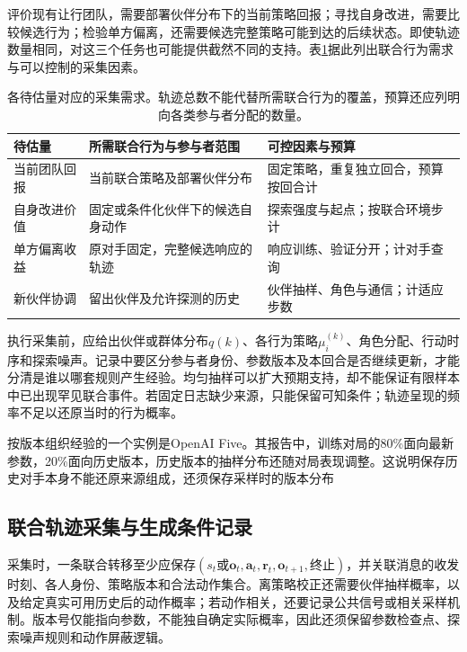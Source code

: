 评价现有让行团队，需要部署伙伴分布下的当前策略回报；寻找自身改进，需要比较候选行为；检验单方偏离，还需要候选完整策略可能到达的后续状态。即使轨迹数量相同，对这三个任务也可能提供截然不同的支持。表\ref{tab:rl-multi-agent-data-needs}据此列出联合行为需求与可以控制的采集因素。

\begin{table}[htbp]
 \centering
 \begin{tabularx}{\linewidth}{@{}l >{\raggedright\arraybackslash}X >{\raggedright\arraybackslash}X@{}}
 \toprule
 待估量 & 所需联合行为与参与者范围 & 可控因素与预算\\
 \midrule
 当前团队回报 & 当前联合策略及部署伙伴分布 & 固定策略，重复独立回合，预算按回合计\\
 自身改进价值 & 固定或条件化伙伴下的候选自身动作 & 探索强度与起点；按联合环境步计\\
 单方偏离收益 & 原对手固定，完整候选响应的轨迹 & 响应训练、验证分开；计对手查询\\
 新伙伴协调 & 留出伙伴及允许探测的历史 & 伙伴抽样、角色与通信；计适应步数\\
 \bottomrule
 \end{tabularx}
 \caption{各待估量对应的采集需求。轨迹总数不能代替所需联合行为的覆盖，预算还应列明向各类参与者分配的数量。}
 \label{tab:rl-multi-agent-data-needs}
\end{table}

执行采集前，应给出伙伴或群体分布$q(k)$、各行为策略$\mu_i^{(k)}$、角色分配、行动时序和探索噪声。记录中要区分参与者身份、参数版本及本回合是否继续更新，才能分清是谁以哪套规则产生经验。均匀抽样可以扩大预期支持，却不能保证有限样本中已出现罕见联合事件。若固定日志缺少来源，只能保留可知条件；轨迹呈现的频率不足以还原当时的行为概率。

按版本组织经验的一个实例是OpenAI Five。其报告中，训练对局的80\%面向最新参数，20\%面向历史版本，历史版本的抽样分布还随对局表现调整。这说明保存历史对手本身不能还原来源组成，还须保存采样时的版本分布

\subsection{联合轨迹采集与生成条件记录}
\label{sec:rl-multi-agent-records}

采集时，一条联合转移至少应保存$(s_t\text{或}\bm o_t,\bm a_t,\bm r_t,\bm o_{t+1},\text{终止})$，并关联消息的收发时刻、各人身份、策略版本和合法动作集合。离策略校正还需要伙伴抽样概率，以及给定真实可用历史后的动作概率；若动作相关，还要记录公共信号或相关采样机制。版本号仅能指向参数，不能独自确定实际概率，因此还须保留参数检查点、探索噪声规则和动作屏蔽逻辑。

